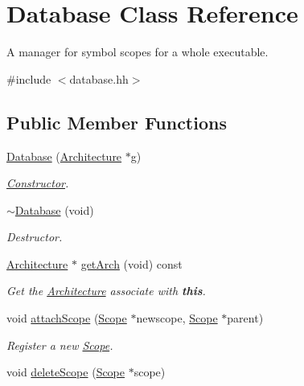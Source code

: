 \hypertarget{class_database}{}\section{Database Class Reference}
\label{class_database}


A manager for symbol scopes for a whole executable.  




{\ttfamily \#include $<$database.\+hh$>$}

\subsection*{Public Member Functions}
\begin{DoxyCompactItemize}
\item 
\mbox{\hyperlink{class_database_ab71b47881aadf1df2dc7655386449a85}{Database}} (\mbox{\hyperlink{class_architecture}{Architecture}} $\ast$g)
\begin{DoxyCompactList}\small\item\em \mbox{\hyperlink{class_constructor}{Constructor}}. \end{DoxyCompactList}\item 
\mbox{\hyperlink{class_database_a46b5202fd52c60dc229a35aa181697a6}{$\sim$\+Database}} (void)
\begin{DoxyCompactList}\small\item\em Destructor. \end{DoxyCompactList}\item 
\mbox{\hyperlink{class_architecture}{Architecture}} $\ast$ \mbox{\hyperlink{class_database_a40c66154335d11a4486067f92806bcac}{get\+Arch}} (void) const
\begin{DoxyCompactList}\small\item\em Get the \mbox{\hyperlink{class_architecture}{Architecture}} associate with {\bfseries{this}}. \end{DoxyCompactList}\item 
void \mbox{\hyperlink{class_database_a1bc096166a8cfde3d77229c9e38bfabf}{attach\+Scope}} (\mbox{\hyperlink{class_scope}{Scope}} $\ast$newscope, \mbox{\hyperlink{class_scope}{Scope}} $\ast$parent)
\begin{DoxyCompactList}\small\item\em Register a new \mbox{\hyperlink{class_scope}{Scope}}. \end{DoxyCompactList}\item 
void \mbox{\hyperlink{class_database_aa7b4011d64dc04148fbf342819f38da5}{delete\+Scope}} (\mbox{\hyperlink{class_scope}{Scope}} $\ast$scope)

\end{DoxyCompactItemize}
